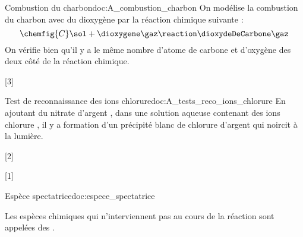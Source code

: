 \begin{doc}{Combustion du charbon}{doc:A_combustion_charbon}
  On modélise la combustion du charbon avec du dioxygène par la réaction chimique suivante :
  \begin{equation*}
    \chemfig{C}\sol + \dioxygene\gaz \reaction \dioxydeDeCarbone\gaz
  \end{equation*}
  On vérifie bien qu'il y a le même nombre d'atome de carbone et d'oxygène des deux côté de la réaction chimique.
\end{doc}


[3]


\begin{doc}{Test de reconnaissance des ions chlorure}{doc:A_tests_reco_ions_chlorure}
  En ajoutant du nitrate d'argent \nitrateDArgent\sol, dans une solution aqueuse contenant des ions chlorure \chlorure, il y a formation d'un précipité blanc de chlorure d'argent \chlorureDArgent\sol qui noircit à la lumière.
\end{doc}

[2]

[1]

\pasCorrection{\vspace*{-4pt}}
\correction{\vspace*{-8pt}}
\begin{doc}{Espèce spectatrice}{doc:espece_spectatrice}
  \begin{importants}
    Les espèces chimiques qui n'interviennent pas au cours de la réaction sont appelées des .
  \end{importants}
\end{doc}
